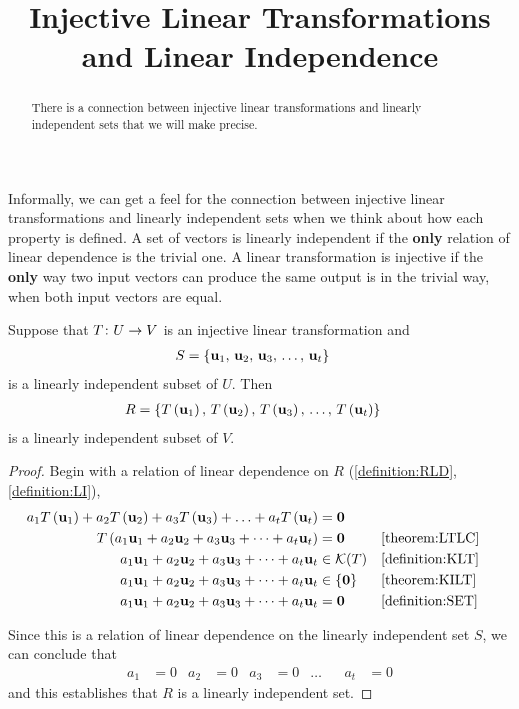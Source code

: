 \documentclass{ximera}
\title{Injective Linear Transformations and Linear Independence}
\begin{document}
\begin{abstract}
There is a connection between injective linear transformations and linearly independent sets that we will make precise.
\end{abstract}
\maketitle


Informally, we can get a feel for the connection between injective
linear transformations and linearly independent sets when we think
about how each property is defined.  A set of vectors is linearly
independent if the \textbf{only} relation of linear dependence is the
trivial one.  A linear transformation is injective if the
\textbf{only} way two input vectors can produce the same output is in
the trivial way, when both input vectors are equal.


\begin{theorem}
\label{theorem:ILTLI}

Suppose that $T\colon U\rightarrow V$ is an injective linear transformation and
\begin{align*}
S&=\left\{\mathbf{u}_{1},\,\mathbf{u}_{2},\,\mathbf{u}_{3},\,\ldots,\,\mathbf{u}_{t}\right\}
\end{align*}
is a linearly independent subset of $U$.  Then
\begin{align*}
R&=\left\{T\left(\mathbf{u}_1\right),\,T\left(\mathbf{u}_2\right),\,T\left(\mathbf{u}_3\right),\,\ldots,\,T\left(\mathbf{u}_t\right)\right\}
\end{align*}
is a linearly independent subset of $V$.

\begin{proof}
Begin with a relation of linear dependence on $R$ (\ref{definition:RLD}, \ref{definition:LI}),
\begin{align*}
a_1T\left(\mathbf{u}_1\right)+a_2T\left(\mathbf{u}_2\right)+a_3T\left(\mathbf{u}_3\right)+\ldots+a_tT\left(\mathbf{u}_t\right)&=\mathbf{0}\\
T\left(a_{1}\mathbf{u}_{1}+a_{2}\mathbf{u}_{2}+a_{3}\mathbf{u}_{3}+\cdots +a_{t}\mathbf{u}_{t}\right)&=\mathbf{0}&&\ref{theorem:LTLC}\\
a_{1}\mathbf{u}_{1}+a_{2}\mathbf{u}_{2}+a_{3}\mathbf{u}_{3}+\cdots +a_{t}\mathbf{u}_{t}&\in\mathcal{K}\!\left(T\right)&&\ref{definition:KLT}\\
a_{1}\mathbf{u}_{1}+a_{2}\mathbf{u}_{2}+a_{3}\mathbf{u}_{3}+\cdots +a_{t}\mathbf{u}_{t}&\in\left\{\mathbf{0}\right\}&&\ref{theorem:KILT}\\
a_{1}\mathbf{u}_{1}+a_{2}\mathbf{u}_{2}+a_{3}\mathbf{u}_{3}+\cdots +a_{t}\mathbf{u}_{t}&=\mathbf{0}&&\ref{definition:SET}\\
\end{align*}

Since this is a relation of linear dependence on the linearly independent set $S$, we can conclude that
\begin{align*}
a_1&=0&a_2&=0&a_3&=0&\ldots&&a_t&=0
\end{align*}
and this establishes that $R$ is a linearly independent set.

\end{proof}
\end{theorem}
\end{document}
